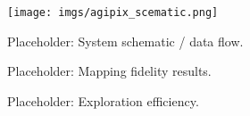 \documentclass[letterpaper, 10 pt, conference]{ieeeconf}  %
\begin{document}
\begin{figure}[t]
        \centering
        \texttt{[image: imgs/agipix\_scematic.png]}
        \caption{Placeholder: System schematic / data flow.}
        \label{fig:system_schematic}
\end{figure}

\begin{figure}[t]
        \centering
        \caption{Placeholder: Mapping fidelity results.}
        \label{fig:results_mapping}
\end{figure}

\begin{figure}[t]
        \centering
        \caption{Placeholder: Exploration efficiency.}
        \label{fig:results_exploration}
\end{figure}


\addtolength{\textheight}{-12cm}



\end{document}
